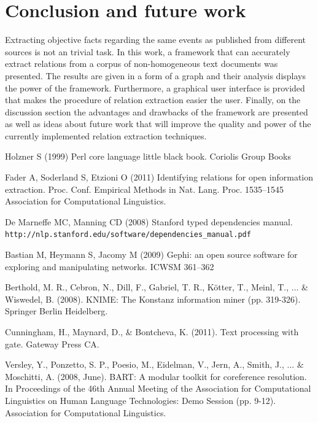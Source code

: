 \documentclass[]{article}
\begin{document}
\section{Conclusion and future work}
%
Extracting objective facts regarding the same events as published from different sources is not an trivial task. In this work, a framework that can accurately extract relations from a corpus of non-homogeneous text documents was presented. The results are given in a form of a graph and their analysis displays the power of the framework. Furthermore, a graphical user interface is provided that makes  the procedure of relation extraction easier the user. Finally, on the discussion section the advantages and drawbacks of the framework are presented as well as ideas about future work that will improve the quality and power of the currently implemented relation extraction techniques.
%
%
\begin{thebibliography}{99}
%

Holzner S (1999)
Perl core language little black book. 
Coriolis Group Books

Fader A, Soderland S, Etzioni O (2011) 
Identifying relations for open information extraction. 
Proc. Conf. Empirical Methods in Nat. Lang. Proc. 1535--1545
Association for Computational Linguistics.

De Marneffe MC, Manning CD (2008)
Stanford typed dependencies manual. \texttt{http://nlp.stanford.edu/software/dependencies\_manual.pdf}

Bastian M, Heymann S, Jacomy M (2009)
Gephi: an open source software for exploring and manipulating networks.
ICWSM 361--362

Berthold, M. R., Cebron, N., Dill, F., Gabriel, T. R., Kötter, T., Meinl, T., ... \& Wiswedel, B. (2008). KNIME: The Konstanz information miner (pp. 319-326). Springer Berlin Heidelberg.

Cunningham, H., Maynard, D., \& Bontcheva, K. (2011). Text processing with gate. Gateway Press CA.

Versley, Y., Ponzetto, S. P., Poesio, M., Eidelman, V., Jern, A., Smith, J., ... \& Moschitti, A. (2008, June). BART: A modular toolkit for coreference resolution. In Proceedings of the 46th Annual Meeting of the Association for Computational Linguistics on Human Language Technologies: Demo Session (pp. 9-12). Association for Computational Linguistics.

\end{thebibliography}
\end{document}
